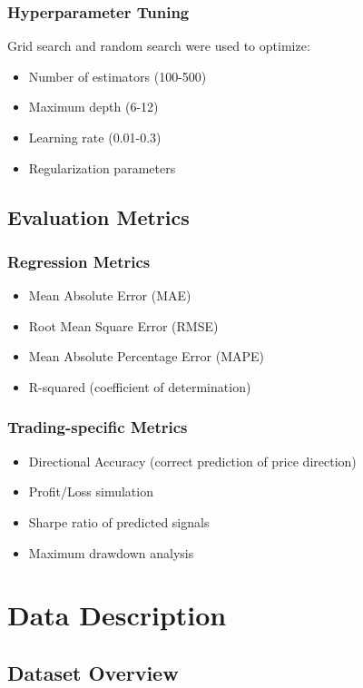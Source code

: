 \documentclass[12pt,a4paper]{article}
\begin{document}
\subsubsection{Hyperparameter Tuning}
Grid search and random search were used to optimize:
\begin{itemize}
    \item Number of estimators (100-500)
    \item Maximum depth (6-12)
    \item Learning rate (0.01-0.3)
    \item Regularization parameters
\end{itemize}

\subsection{Evaluation Metrics}

\subsubsection{Regression Metrics}
\begin{itemize}
    \item Mean Absolute Error (MAE)
    \item Root Mean Square Error (RMSE)
    \item Mean Absolute Percentage Error (MAPE)
    \item R-squared (coefficient of determination)
\end{itemize}

\subsubsection{Trading-specific Metrics}
\begin{itemize}
    \item Directional Accuracy (correct prediction of price direction)
    \item Profit/Loss simulation
    \item Sharpe ratio of predicted signals
    \item Maximum drawdown analysis
\end{itemize}

\section{Data Description}

\subsection{Dataset Overview}
\end{document}
